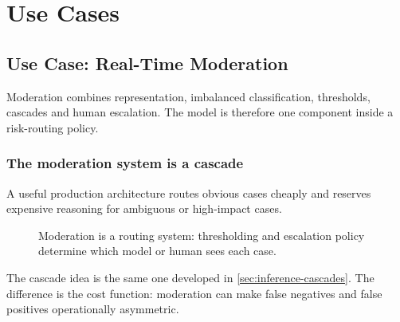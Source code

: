 \chapter{Use Cases}

\section{Use Case: Real-Time Moderation}
\label{chap:moderation}
Moderation combines representation, imbalanced classification, thresholds, cascades and human escalation.
The model is therefore one component inside a risk-routing policy.

\subsection{The moderation system is a cascade}
\label{sec:moderation-cascade}
A useful production architecture routes obvious cases cheaply and reserves expensive reasoning for ambiguous or high-impact cases.

\begin{figure}[htbp]
\centering
{}
\caption{Moderation is a routing system: thresholding and escalation policy determine which model or human sees each case.}
\end{figure}

The cascade idea is the same one developed in \cref{sec:inference-cascades}.
The difference is the cost function: moderation can make false negatives and false positives operationally asymmetric.

